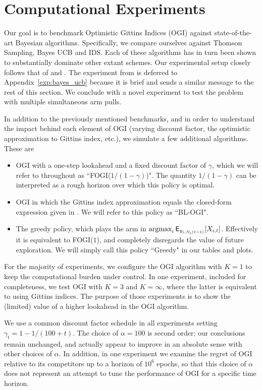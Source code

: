 \section{Computational Experiments} \label{sec:experiments}
Our goal is to benchmark Optimistic Gittins Indices (OGI) against state-of-the-art Bayesian algorithms. Specifically, we compare ourselves against Thomson Sampling, Bayes UCB and IDS. Each of these algorithms has in turn been shown to substantially dominate other extant schemes. Our experimental setup closely follows that of \cite{russo2014learning,kaufmann2012thompson} and \cite{chapelle2011empirical}.
The experiment from \cite{kaufmann2012thompson} is deferred to Appendix~\ref{exp:bayes_ucb} because it is brief and sends a similar message to the rest of this section. We conclude with a novel experiment to test the problem with multiple simultaneous arm pulls.

{\color{blue}In addition to the previously mentioned benchmarks, and in order to understand the impact behind each element of OGI (varying discount factor, the optimistic approximation to Gittins index, etc.), we simulate a few additional algorithms. These are 
\begin{itemize}
	\item OGI with a one-step lookahead and a fixed discount factor of $\gamma$, which we will refer to throughout as ``FOGI($1/(1-\gamma)$)". The quantity $1/(1-\gamma)$ can be interpreted as a rough horizon over which this policy is optimal.
	\item OGI in which the Gittins index approximation equals the closed-form expression given in \cite{brezzi2002optimal}. We will refer to this policy as ``BL-OGI".
	\item The greedy policy, which plays the arm in $\operatorname*{\mathrm{argmax}}_i \mathsf{E}_{y_{i, N_i(t-1)}}[X_{i,t}]$. Effectively it is equivalent to FOGI($1$), and completely disregards the value of future exploration. We will simply call this policy ``Greedy" in our tables and plots.
\end{itemize}}

For the majority of experiments, we configure the OGI algorithm with $K =1$ to keep the computational burden under control. In one experiment, included for completeness, we test OGI with $K = 3$ and $K=\infty$, where the latter is equivalent to using Gittins indices. The purpose of those experiments is to show the (limited) value of a higher lookahead in the OGI algorithm. 

We use a common discount factor schedule in all experiments setting $\gamma_t = 1 - 1/(100 + t)$. The choice of $\alpha = 100$ is second order; our conclusions remain unchanged, and actually appear to improve in an absolute sense with other choices of $\alpha$. In addition, in one experiment we examine the regret of OGI relative to its competitors up to a horizon of $10^6$ epochs, so that this choice of $\alpha$ does not represent an attempt to tune the performance of OGI for a specific time horizon. 



